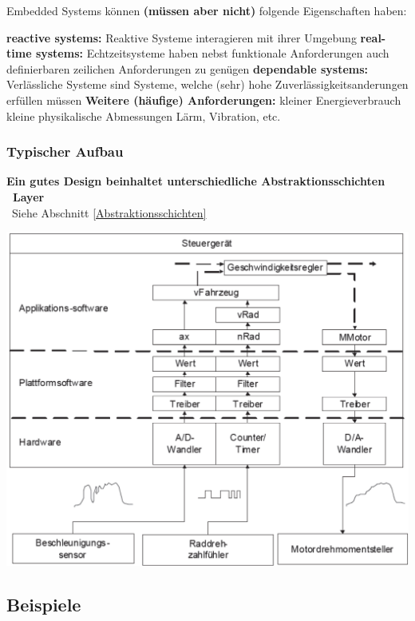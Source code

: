 Embedded Systems können \textbf{(müssen aber nicht)} folgende Eigenschaften haben:

\begin{outline}
    \1 \textbf{reactive systems:}  Reaktive Systeme interagieren mit ihrer Umgebung
    \1 \textbf{real-time systems:} Echtzeitsysteme haben nebst funktionale Anforderungen auch definierbaren zeilichen Anforderungen zu genügen
    \1 \textbf{dependable systems:} Verlässliche Systeme sind Systeme, welche (sehr) hohe Zuverlässigkeitsanderungen erfüllen müssen
    \1 \textbf{Weitere (häufige) Anforderungen:} 
        \2 kleiner Energieverbrauch
        \2 kleine physikalische Abmessungen
        \2 Lärm, Vibration, etc.
\end{outline}


\subsubsection{Typischer Aufbau}

\textbf{Ein gutes Design beinhaltet unterschiedliche Abstraktionsschichten \textrightarrow\ Layer} \\
\textrightarrow\ Siehe Abschnitt \ref{Abstraktionsschichten}

\begin{center}
    \includegraphics[width=0.7\columnwidth]{images/embedded_system_aufbau_schichten.png}
\end{center}


\subsection{Beispiele}

